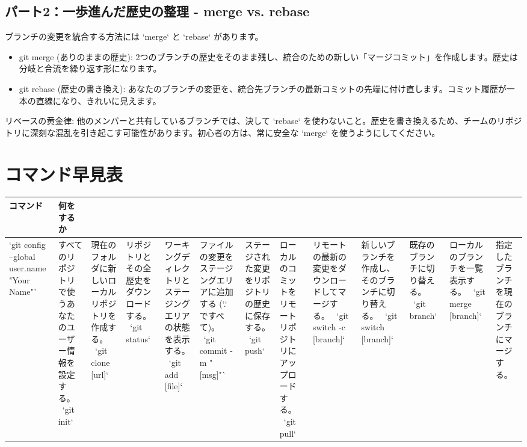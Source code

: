 \documentclass{ltjsarticle}
\begin{document}
\subsection{パート2：一歩進んだ歴史の整理 - merge vs. rebase}
ブランチの変更を統合する方法には `merge` と `rebase` があります。
\begin{itemize}
    \item git merge (ありのままの歴史): 2つのブランチの歴史をそのまま残し、統合のための新しい「マージコミット」を作成します。歴史は分岐と合流を繰り返す形になります。
    \item git rebase (歴史の書き換え): あなたのブランチの変更を、統合先ブランチの最新コミットの先端に付け直します。コミット履歴が一本の直線になり、きれいに見えます。
\end{itemize}
リベースの黄金律: 他のメンバーと共有しているブランチでは、決して `rebase` を使わないこと。歴史を書き換えるため、チームのリポジトリに深刻な混乱を引き起こす可能性があります。初心者の方は、常に安全な `merge` を使うようにしてください。

\appendix
\section{コマンド早見表}
\begin{tabularx}{\textwidth}{|l|X|}
\hline
コマンド & 何をするか \\ 
\hline
`git config --global user.name "Your Name"` & すべてのリポジトリで使うあなたのユーザー情報を設定する。 \ 
`git init` & 現在のフォルダに新しいローカルリポジトリを作成する。 \ 
`git clone [url]` & リポジトリとその全歴史をダウンロードする。 \ 
`git status` & ワーキングディレクトリとステージングエリアの状態を表示する。 \ 
`git add [file]` & ファイルの変更をステージングエリアに追加する (`.` ですべて)。 \ 
`git commit -m "[msg]"` & ステージされた変更をリポジトリの歴史に保存する。 \ 
`git push` & ローカルのコミットをリモートリポジトリにアップロードする。 \ 
`git pull` & リモートの最新の変更をダウンロードしてマージする。 \ 
`git switch -c [branch]` & 新しいブランチを作成し、そのブランチに切り替える。 \ 
`git switch [branch]` & 既存のブランチに切り替える。 \ 
`git branch` & ローカルのブランチを一覧表示する。 \ 
`git merge [branch]` & 指定したブランチを現在のブランチにマージする。 \ 
\hline
\end{tabularx}
\end{document}
